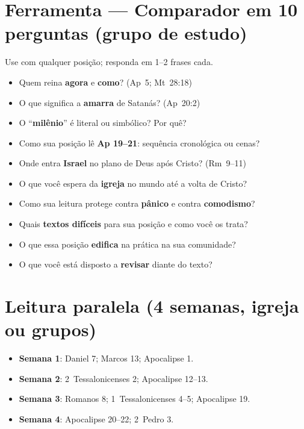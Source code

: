 \section{Ferramenta — Comparador em 10 perguntas (grupo de estudo)}
Use com qualquer posição; responda em 1--2 frases cada.
\begin{checklist}
\begin{itemize}[leftmargin=*,noitemsep]
  \item Quem reina \textbf{agora} e \textbf{como}? (Ap~5; Mt~28:18)
  \item O que significa a \textbf{amarra} de Satanás? (Ap~20:2)
  \item O ``\textbf{milênio}'' é literal ou simbólico? Por quê?
  \item Como sua posição lê \textbf{Ap 19--21}: sequência cronológica ou cenas?
  \item Onde entra \textbf{Israel} no plano de Deus após Cristo? (Rm~9--11)
  \item O que você espera da \textbf{igreja} no mundo até a volta de Cristo?
  \item Como sua leitura protege contra \textbf{pânico} e contra \textbf{comodismo}?
  \item Quais \textbf{textos difíceis} para sua posição e como você os trata?
  \item O que essa posição \textbf{edifica} na prática na sua comunidade?
  \item O que você está disposto a \textbf{revisar} diante do texto?
\end{itemize}
\end{checklist}

\section{Leitura paralela (4 semanas, igreja ou grupos)}
\begin{checklist}[title={Plano simples}]
\begin{itemize}[leftmargin=*,noitemsep]
  \item \textbf{Semana 1}: Daniel 7; Marcos 13; Apocalipse 1.
  \item \textbf{Semana 2}: 2~Tessalonicenses 2; Apocalipse 12--13.
  \item \textbf{Semana 3}: Romanos 8; 1~Tessalonicenses 4--5; Apocalipse 19.
  \item \textbf{Semana 4}: Apocalipse 20--22; 2~Pedro 3.
\end{itemize}
\end{checklist}

